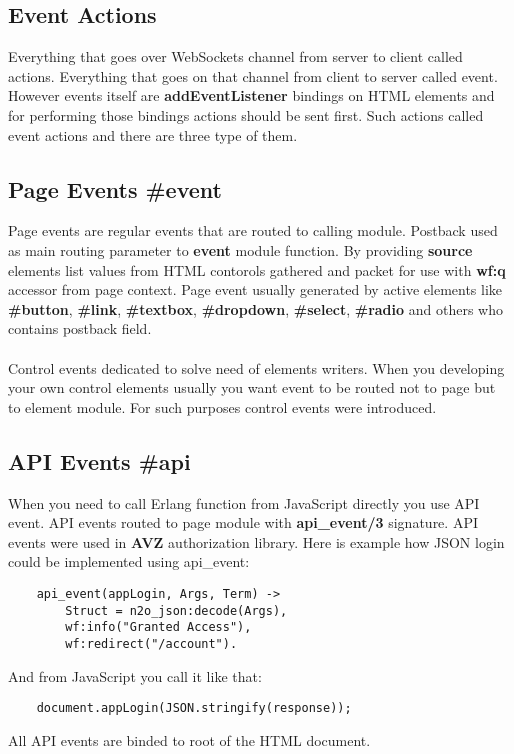 \newpage
\subsection*{Event Actions}
Everything that goes over WebSockets channel from server to client called actions.
Everything that goes on that channel from client to server called event. However
events itself are {\bf addEventListener} bindings on HTML elements and for performing those bindings
actions should be sent first. Such actions called event actions and there are three type
of them.

\subsection{Page Events \#event}
Page events are regular events that are routed to calling module. Postback used as main
routing parameter to {\bf event} module function. By providing {\bf source} elements list
values from HTML contorols gathered and packet for use with {\bf wf:q} accessor from page context.
Page event usually generated by active elements like {\bf \#button}, {\bf \#link},
{\bf \#textbox}, {\bf \#dropdown}, {\bf \#select}, {\bf \#radio} and others who contains postback field.

\paragraph{}
Control events dedicated to solve need of elements writers. When you developing your
own control elements usually you want event to be routed not to page but to element module.
For such purposes control events were introduced.

\subsection{API Events \#api}
When you need to call Erlang function from JavaScript directly you use API event.
API events routed to page module with {\bf api\_event/3} signature. API events were
used in {\bf AVZ} authorization library. Here is example how JSON login could be
implemented using api\_event:

\vspace{1\baselineskip}
\begin{lstlisting}
    api_event(appLogin, Args, Term) ->
        Struct = n2o_json:decode(Args),
        wf:info("Granted Access"),
        wf:redirect("/account").
\end{lstlisting}
\vspace{1\baselineskip}
And from JavaScript you call it like that:
\vspace{1\baselineskip}
\begin{lstlisting}
    document.appLogin(JSON.stringify(response));
\end{lstlisting}
\vspace{1\baselineskip}
All API events are binded to root of the HTML document.


